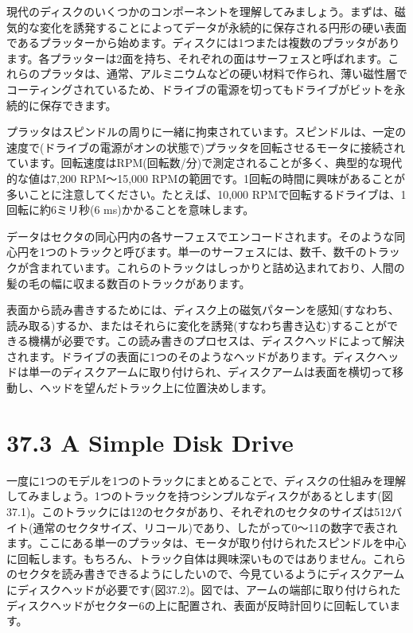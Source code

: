 現代のディスクのいくつかのコンポーネントを理解してみましょう。まずは、磁気的な変化を誘発することによってデータが永続的に保存される円形の硬い表面であるプラッターから始めます。ディスクには1つまたは複数のプラッタがあります。各プラッターは2面を持ち、それぞれの面はサーフェスと呼ばれます。これらのプラッタは、通常、アルミニウムなどの硬い材料で作られ、薄い磁性層でコーティングされているため、ドライブの電源を切ってもドライブがビットを永続的に保存できます。

プラッタはスピンドルの周りに一緒に拘束されています。スピンドルは、一定の速度で(ドライブの電源がオンの状態で)プラッタを回転させるモータに接続されています。回転速度はRPM(回転数/分)で測定されることが多く、典型的な現代的な値は7,200
RPM〜15,000
RPMの範囲です。1回転の時間に興味があることが多いことに注意してください。たとえば、10,000
RPMで回転するドライブは、1回転に約6ミリ秒(6 ms)かかることを意味します。

データはセクタの同心円内の各サーフェスでエンコードされます。そのような同心円を1つのトラックと呼びます。単一のサーフェスには、数千、数千のトラックが含まれています。これらのトラックはしっかりと詰め込まれており、人間の髪の毛の幅に収まる数百のトラックがあります。

表面から読み書きするためには、ディスク上の磁気パターンを感知(すなわち、読み取る)するか、またはそれらに変化を誘発(すなわち書き込む)することができる機構が必要です。この読み書きのプロセスは、ディスクヘッドによって解決されます。ドライブの表面に1つのそのようなヘッドがあります。ディスクヘッドは単一のディスクアームに取り付けられ、ディスクアームは表面を横切って移動し、ヘッドを望んだトラック上に位置決めします。

\hypertarget{a-simple-disk-drive}{%
\section*{37.3 A Simple Disk Drive}\label{a-simple-disk-drive}}

一度に1つのモデルを1つのトラックにまとめることで、ディスクの仕組みを理解してみましょう。1つのトラックを持つシンプルなディスクがあるとします(図37.1)。このトラックには12のセクタがあり、それぞれのセクタのサイズは512バイト(通常のセクタサイズ、リコール)であり、したがって0〜11の数字で表されます。ここにある単一のプラッタは、モータが取り付けられたスピンドルを中心に回転します。もちろん、トラック自体は興味深いものではありません。これらのセクタを読み書きできるようにしたいので、今見ているようにディスクアームにディスクヘッドが必要です(図37.2)。図では、アームの端部に取り付けられたディスクヘッドがセクター6の上に配置され、表面が反時計回りに回転しています。

